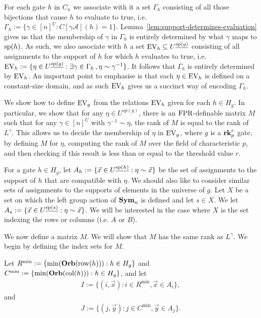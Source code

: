 \documentclass[../paper.tex]{subfiles}
\begin{document}
For each gate $h$ in $C_n$ we associate with it a set $\Gamma_h$ consisting of
all those bijections that cause $h$ to evaluate to true, i.e. $\Gamma_h:=
\{\gamma \in [n]^{\underline{U}} : C[\gamma \mathcal{A}](h) = 1 \}$.
Lemma~\ref{lem:support-determines-evaluation} gives us that the membership of
$\gamma$ in $\Gamma_h$ is entirely determined by what $\gamma$ maps to
$\text{sp}(h)$. As such, we also associate with $h$ a set $\text{EV}_h \subseteq
U^{\underline{\text{sp}(g)}}$ consisting of all assignments to the support of $h$
for which $h$ evaluates to true, i.e. $\text{EV}_h := \{ \eta \in
U^{\underline{\text{sp}(g)}} : \exists \gamma \in \Gamma_h \, ,\eta \sim
\gamma^{-1}\}$. It follows that $\Gamma_h$ is entirely determined by $\text{EV}_h$. An
important point to emphasise is that each $\eta \in \text{EV}_h$ is defined on a
constant-size domain, and as such $\text{EV}_h$ gives us a succinct way of encoding
$\Gamma_h$.

We show how to define $\text{EV}_g$ from the relations $\text{EV}_h$ given for each $h \in
H_g$. In particular, we show that for any $\eta \in U^{\underline{sp(g)}}$,
there is an $\text{\upshape FPR}$-definable matrix $M$ such that for any $\gamma \in
[n]^{\underline{U}}$ with $\gamma^{-1} \sim \eta$, the rank of $M$ is equal to
the rank of $L^{\gamma}$. This allows us to decide the membership of $\eta$ in
$\text{EV}_g$, where $g$ is a $\text{\textbf{rk}}^r_p$ gate, by defining $M$ for $\eta$, computing
the rank of $M$ over the field of characteristic $p$, and then checking if this
result is less than or equal to the threshold value $r$.

For a gate $h \in H_g$, let $A_h := \{\vec{x} \in U^{\underline{\text{sp}(h)}} :
\eta \sim \vec{x}\}$ be the set of assignments to the support of $h$ that are
compatible with $\eta$. We should also like to consider similar sets of
assignments to the supports of elements in the universe of $g$. Let $X$ be a set
on which the left group action of $\text{\textbf{Sym}}_n$ is defined and let $s \in X$. We let
$A_s := \{\vec{x} \in U^{\underline{\text{sp}(s)}} : \eta \sim \vec{x}\}$. We will
be interested in the case where $X$ is the set indexing the rows or columns
(i.e. $A$ or $B$).

We now define a matrix $M$. We will show that $M$ has the same rank as
$L^{\gamma}$. We begin by defining the index sets for $M$.

Let $R^{\min} := \{\min (\text{\textbf{Orb}}(\text{row}(h))) : h \in H_g\}$ and $C^{\min} := \{ \min
(\text{\textbf{Orb}} (\text{col}(h))) : h \in H_g\}$, and let
\begin{align*}
	I := \{(i, \vec{x}): i \in R^{\min}, \vec{x} \in A_i\}, 
\end{align*}
and
\begin{align*}
	J := \{(j, \vec{y}): j \in C^{\min}, \vec{y} \in A_j\}. 
\end{align*}
\end{document}
